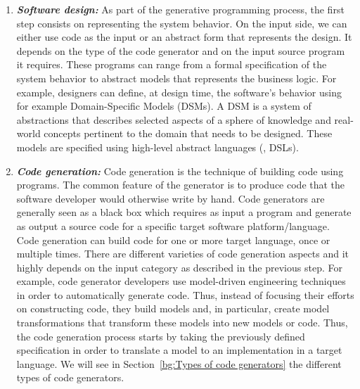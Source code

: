 \begin{enumerate}
	\item \textbf{\textit{Software design:}} 
	As part of the generative programming process, the first step consists on representing the system behavior. 
	On the input side, we can either use code as the input or an abstract form that represents the design. It depends on the type of the code generator and on the input source program it requires. These programs can range from a formal specification of the system behavior to abstract models that represents the business logic.
	For example, designers can define, at design time, the software's behavior using for example Domain-Specific Models (DSMs).
	A DSM is a system of abstractions that describes selected aspects of a sphere of knowledge and real-world concepts pertinent to the domain that needs to be designed. These models are specified using high-level abstract languages (\ie, DSLs). %
	
	\item \textbf{\textit{Code generation:}} 
	Code generation is the technique of building code using programs. The common feature of the generator is to produce code that the software developer would otherwise write by hand.
	Code generators are generally seen as a black box which requires as input a program and generate as output a source code for a specific target software platform/language. %
	Code generation can build code for one or more target language, once or multiple times. There are different varieties of code generation aspects and it highly depends on the input category as described in the previous step. 
	For example, code generator developers use model-driven engineering techniques in order to automatically generate code. Thus, instead of focusing their efforts on constructing code, they build models and, in particular, create model transformations that transform these models into new models or code. Thus, the code generation process starts by taking the previously defined specification in order to translate a model to an implementation in a target language. We will see in Section~\ref{bg:Types of code generators} the different types of code generators.
	

\end{enumerate}
